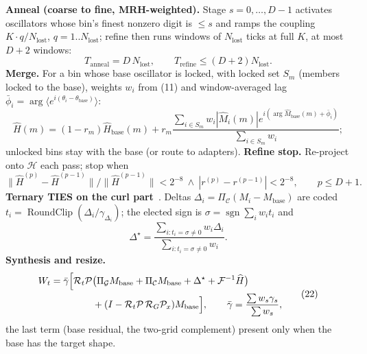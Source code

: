 \documentclass[11pt]{article}
\newcommand{\RoundClip}{\operatorname{RoundClip}}
\begin{document}
\textbf{Anneal (coarse to fine, MRH-weighted).} Stage $s=0,\dots,D-1$ activates oscillators whose bin's finest nonzero digit is $\le s$ and ramps the coupling $K\cdot q/N_{\mathrm{lost}}$, $q=1..N_{\mathrm{lost}}$; refine then runs windows of $N_{\mathrm{lost}}$ ticks at full $K$, at most $D+2$ windows:
\begin{equation}T_{\mathrm{anneal}}=D\,N_{\mathrm{lost}},\qquad T_{\mathrm{refine}}\le (D+2)N_{\mathrm{lost}}.\tag{18}\end{equation}
\textbf{Merge.} For a bin whose base oscillator is locked, with locked set $S_m$ (members locked to the base), weights $w_i$ from (11) and window-averaged lag $\bar\phi_i=\arg\langle e^{i(\theta_i-\theta_{\mathrm{base}})}\rangle$:
\begin{equation}\widehat H(m)=(1-r_m)\widehat H_{\mathrm{base}}(m)+r_m\frac{\sum_{i\in S_m}w_i|\widehat M_i(m)|e^{i(\arg\widehat M_{\mathrm{base}}(m)+\bar\phi_i)}}{\sum_{i\in S_m}w_i};\tag{19}\end{equation}
unlocked bins stay with the base (or route to adapters).
\textbf{Refine stop.} Re-project onto $\mathcal H$ each pass; stop when
\begin{equation}\|\widehat H^{(p)}-\widehat H^{(p-1)}\|/\|\widehat H^{(p-1)}\|<2^{-8}\ \wedge\ |r^{(p)}-r^{(p-1)}|<2^{-8},\qquad p\le D+1. \tag{20}\end{equation}
\textbf{Ternary TIES on the curl part}~\cite{ties}. Deltas $\Delta_i=\Pi_{\mathcal C}(M_i-M_{\mathrm{base}})$ are coded $t_i=\RoundClip(\Delta_i/\gamma_{\Delta_i})$; the elected sign is $\sigma=\operatorname{sgn}\sum_iw_it_i$ and
\begin{equation}\Delta^\star=\frac{\sum_{i:t_i=\sigma\neq0}w_i\Delta_i}{\sum_{i:t_i=\sigma\neq0}w_i}.\tag{21}\end{equation}
\textbf{Synthesis and resize.}
\begin{equation}\begin{split}W_t=\bar\gamma\Bigl[&\mathcal R_t\mathcal P\bigl(\Pi_{\mathcal G}M_{\mathrm{base}}+\Pi_{\mathcal C}M_{\mathrm{base}}+\Delta^\star+\mathcal F^{-1}\widehat H\bigr)\\&\qquad+(I-\mathcal R_t\mathcal P\,\mathcal R_G\mathcal P_x)M_{\mathrm{base}}\Bigr],\qquad\bar\gamma=\frac{\sum w_s\gamma_s}{\sum w_s},\end{split}\tag{22}\end{equation}
the last term (base residual, the two-grid complement) present only when the base has the target shape.
\end{document}
